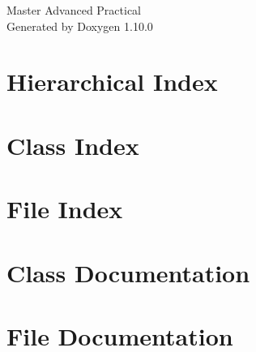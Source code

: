 \documentclass[twoside]{book}
\newcommand{\+}{\discretionary{\mbox{\scriptsize$\hookleftarrow$}}{}{}}
\newcommand{\clearemptydoublepage}{%
    \newpage{\pagestyle{empty}\cleardoublepage}%
  }
\begin{document}
  \raggedbottom
    \hypersetup{pageanchor=false,
                bookmarksnumbered=true,
                pdfencoding=unicode
               }
  \begin{titlepage}
  \vspace*{7cm}
  \begin{center}%
  {\Large Master Advanced Practical}\\
  \vspace*{1cm}
  {\large Generated by Doxygen 1.10.0}\\
  \end{center}
  \end{titlepage}
  \clearemptydoublepage
  \tableofcontents
  \clearemptydoublepage
  \hypersetup{pageanchor=true}
\chapter{Hierarchical Index}

\chapter{Class Index}

\chapter{File Index}

\chapter{Class Documentation}





\chapter{File Documentation}





  \backmatter
  \newpage
  \clearemptydoublepage
  \printindex
\end{document}
